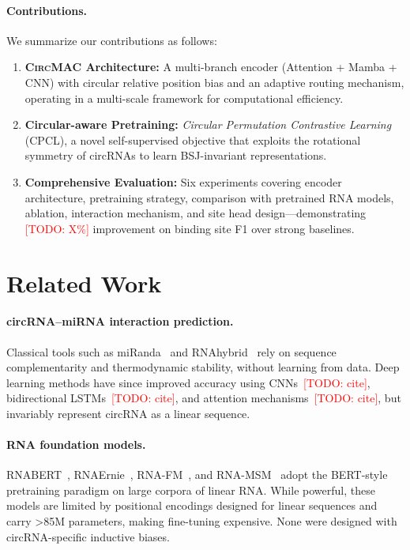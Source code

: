 \documentclass[10pt,twocolumn]{article}
\newcommand{\todo}[1]{\textcolor{red}{[TODO: #1]}}
\newcommand{\circmac}{\textsc{CircMAC}}
\begin{document}
\paragraph{Contributions.} We summarize our contributions as follows:
\begin{enumerate}[leftmargin=*,itemsep=2pt]
  \item \textbf{\circmac{} Architecture:} A multi-branch encoder
    (Attention + Mamba + CNN) with circular relative position bias
    and an adaptive routing mechanism, operating in a multi-scale
    framework for computational efficiency.
  \item \textbf{Circular-aware Pretraining:}
    \emph{Circular Permutation Contrastive Learning} (CPCL), a novel
    self-supervised objective that exploits the rotational symmetry of
    circRNAs to learn BSJ-invariant representations.
  \item \textbf{Comprehensive Evaluation:}
    Six experiments covering encoder architecture, pretraining strategy,
    comparison with pretrained RNA models, ablation, interaction mechanism,
    and site head design---demonstrating \todo{X\%} improvement on binding
    site F1 over strong baselines.
\end{enumerate}

\section{Related Work}
\label{sec:related}

\paragraph{circRNA--miRNA interaction prediction.}
Classical tools such as miRanda~\cite{enright2003microrna} and
RNAhybrid~\cite{rehmsmeier2004fast} rely on sequence complementarity
and thermodynamic stability, without learning from data.
Deep learning methods have since improved accuracy using
CNNs~\todo{cite}, bidirectional LSTMs~\todo{cite}, and attention
mechanisms~\todo{cite}, but invariably represent circRNA as a linear
sequence.

\paragraph{RNA foundation models.}
RNABERT~\cite{akiyama2022informative}, RNAErnie~\cite{wang2023rnasolo},
RNA-FM~\cite{chen2022interpretable}, and RNA-MSM~\cite{zhang2024multiple}
adopt the BERT-style pretraining paradigm on large corpora of linear RNA.
While powerful, these models are limited by positional encodings designed
for linear sequences and carry \textgreater85M parameters, making
fine-tuning expensive.
None were designed with circRNA-specific inductive biases.
\end{document}
